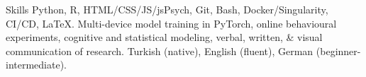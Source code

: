 
\begin{rubric}{Skills}
\entry*[Technical]
	Python, R, HTML/CSS/JS/jsPsych, Git, Bash, Docker/Singularity, CI/CD, \LaTeX. 
\entry*[Research]
	Multi-device model training in PyTorch, online behavioural experiments, cognitive and statistical modeling, verbal, written, \& visual communication of research.
\entry*[Languages]
	Turkish (native), English (fluent), German (beginner-intermediate).
\end{rubric}
